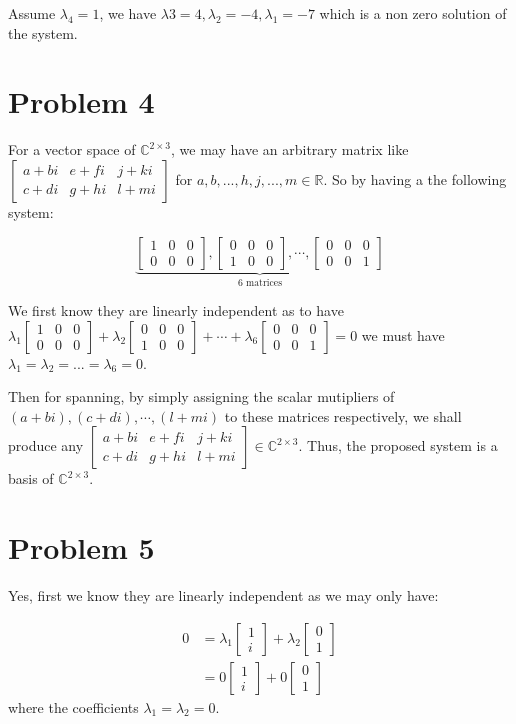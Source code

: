 \documentclass[11pt]{article}
\providecommand{\qbm}[1]{\begin{bmatrix} #1 \end{bmatrix}}
\begin{document}
Assume $\lambda_4 = 1$, we have $\lambda 3 = 4, \lambda_2 = -4, \lambda_1 = -7$ which is a non zero solution of the system.


\section*{Problem 4}

For a vector space of $\mathbb{C}^{2 \times 3}$, we may have an arbitrary matrix like $\qbm{a + bi & e + fi & j + ki \\ c + di & g + hi & l + mi}$ for $a, b, ..., h, j, ..., m \in \mathbb{R}$. So by having a the following system:

\begin{equation*}
    \underbrace{ \qbm{1 & 0 & 0 \\ 0 & 0 & 0 }, \qbm{0 & 0 & 0 \\ 1 & 0 & 0 }, \cdots, \qbm{0 & 0 & 0 \\ 0 & 0 & 1}}_\text{6 matrices}
\end{equation*}

We first know they are linearly independent as to have $\lambda_1 \qbm{1 & 0 & 0 \\ 0 & 0 & 0 } +\lambda_2  \qbm{0 & 0 & 0 \\ 1 & 0 & 0 } +  \cdots + \lambda_6 \qbm{0 & 0 & 0 \\ 0 & 0 & 1} = 0$ we must have $\lambda_1 = \lambda_2 = ... = \lambda_6 = 0$.

Then for spanning, by simply assigning the scalar mutipliers of $(a + bi), (c + di), \cdots, (l + mi)$ to these matrices respectively, we shall produce any $\qbm{a + bi & e + fi & j + ki \\ c + di & g + hi & l + mi} \in \mathbb{C}^{2 \times 3}$. Thus, the proposed system is a basis of $\mathbb{C}^{2 \times 3}$.

\section*{Problem 5}

Yes, first we know they are linearly independent as we may only have:

\begin{align*}
    0 &= \lambda_1 \begin{bmatrix} 1 \\ i \end{bmatrix} + \lambda_2 \begin{bmatrix} 0 \\ 1 \end{bmatrix} \\
    &= 0 \begin{bmatrix} 1 \\ i \end{bmatrix} + 0 \begin{bmatrix} 0 \\ 1 \end{bmatrix}
\end{align*}
where the coefficients $\lambda_1 = \lambda_2 = 0$.
\end{document}
